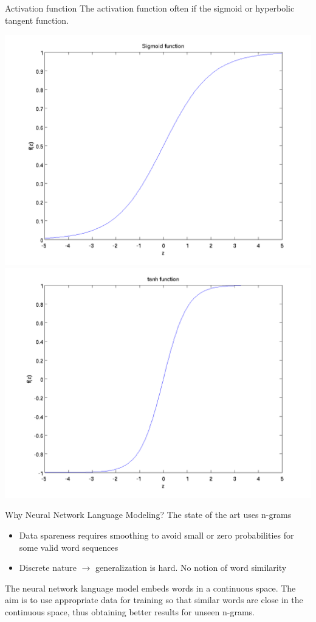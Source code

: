 \documentclass{beamer}
\begin{document}
\begin{frame}{Activation function}
	The activation function often if the sigmoid or hyperbolic tangent function.
	\begin{center}
		\includegraphics[scale=0.28]{images/sigmoid.png}
		\includegraphics[scale=0.28]{images/tanh.png}
	\end{center}
\end{frame}

\begin{frame}{Why Neural Network Language Modeling?}
	The state of the art uses n-grams
	\begin{itemize}
		\item Data spareness requires smoothing to avoid small or zero probabilities for some valid word sequences
		\item Discrete nature $\rightarrow$ generalization is hard. No notion of word similarity
	\end{itemize}
	\vspace{5mm}
	The neural network language model embeds words in a continuous space. The aim is to use appropriate data for training so that similar words are close in the continuous space, thus obtaining better results for unseen n-grams.
\end{frame}
\end{document}
